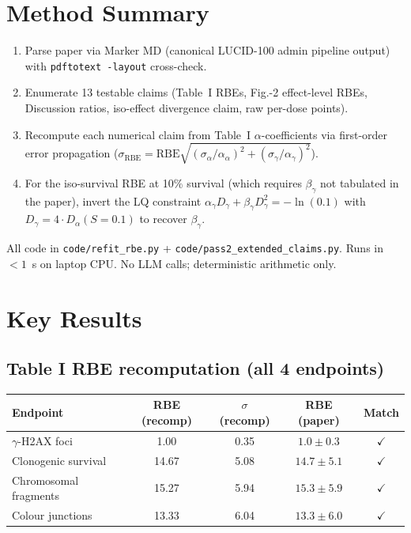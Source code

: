 \documentclass[11pt]{article}
\begin{document}
\section{Method Summary}
\begin{enumerate}
\item Parse paper via Marker MD (canonical LUCID-100 admin pipeline output)
      with \texttt{pdftotext -layout} cross-check.
\item Enumerate 13 testable claims (Table~I RBEs, Fig.-2 effect-level RBEs,
      Discussion ratios, iso-effect divergence claim, raw per-dose points).
\item Recompute each numerical claim from Table~I $\alpha$-coefficients via
      first-order error propagation ($\sigma_{\text{RBE}} =
      \text{RBE}\sqrt{(\sigma_{\alpha}/\alpha_{\alpha})^2 +
                       (\sigma_{\gamma}/\alpha_{\gamma})^2}$).
\item For the iso-survival RBE at 10\% survival (which requires $\beta_\gamma$
      not tabulated in the paper), invert the LQ constraint
      $\alpha_\gamma D_\gamma + \beta_\gamma D_\gamma^2 = -\ln(0.1)$ with
      $D_\gamma = 4 \cdot D_\alpha(S=0.1)$ to recover $\beta_\gamma$.
\end{enumerate}

All code in \texttt{code/refit\_rbe.py} + \texttt{code/pass2\_extended\_claims.py}.
Runs in ${<}1$~s on laptop CPU. No LLM calls; deterministic arithmetic only.

\section{Key Results}

\subsection{Table I RBE recomputation (all 4 endpoints)}
\begin{center}
\begin{tabular}{lcccc}
\toprule
Endpoint & RBE (recomp) & $\sigma$ (recomp) & RBE (paper) & Match \\
\midrule
$\gamma$-H2AX foci       & 1.00  & 0.35 & $1.0\pm0.3$  & $\checkmark$ \\
Clonogenic survival      & 14.67 & 5.08 & $14.7\pm5.1$ & $\checkmark$ \\
Chromosomal fragments    & 15.27 & 5.94 & $15.3\pm5.9$ & $\checkmark$ \\
Colour junctions         & 13.33 & 6.04 & $13.3\pm6.0$ & $\checkmark$ \\
\bottomrule
\end{tabular}
\end{center}
\end{document}
